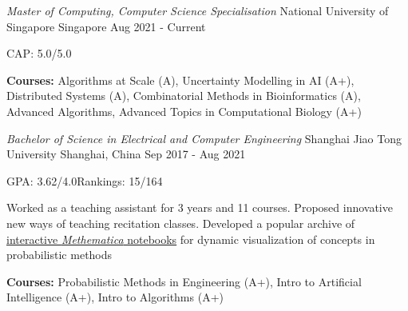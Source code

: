 

\begin{cventries}

  \cventry
    {\it Master of Computing, Computer Science Specialisation} %
    {National University of Singapore} %
    {Singapore} %
    {Aug 2021 - Current} %
    {
      \begin{cvitems} %
        \item {CAP: 5.0/5.0}
        \item {\textbf{Courses:} Algorithms at Scale (A), Uncertainty Modelling in AI (A+), Distributed Systems (A), Combinatorial Methods in Bioinformatics (A), Advanced Algorithms, Advanced Topics in Computational Biology (A+)}
      \end{cvitems}
    }
    
  \cventry
    {\it Bachelor of Science in Electrical and Computer Engineering} %
    {Shanghai Jiao Tong University} %
    {Shanghai, China} %
    {Sep 2017 - Aug 2021} %
    {
      \begin{cvitems} %
        \item {GPA: 3.62/4.0\qquad Rankings: 15/164}
        \item {Worked as a teaching assistant for 3 years and 11 courses. Proposed innovative new ways of teaching recitation classes. Developed a popular archive of \href{https://github.com/GZHoffie/VE401-recitation-class}{interactive \textit{Methematica} notebooks} for dynamic visualization of concepts in probabilistic methods}
        \item {\textbf{Courses:} Probabilistic Methods in Engineering (A+), Intro to Artificial Intelligence (A+), Intro to Algorithms (A+)}
      \end{cvitems}
    }
\end{cventries}
